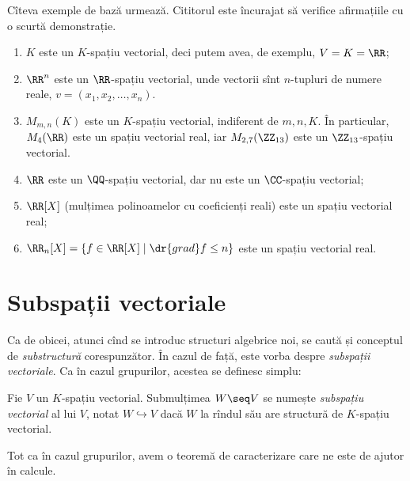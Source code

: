 Cîteva exemple de bază urmează. Cititorul este încurajat să verifice afirmațiile cu o scurtă
demonstrație.
\begin{enumerate}
\item $ K $ este un $ K $-spațiu vectorial, deci putem avea, de exemplu, $ V = K = \RR $;
\item $ \RR^n $ este un $ \RR $-spațiu vectorial, unde vectorii sînt $ n $-tupluri
  de numere reale, $ v = (x_1, x_2, \dots, x_n) $.
\item $ M_{m, n}(K) $ este un $ K $-spațiu vectorial, indiferent de $ m, n, K $. În particular,
  $ M_4(\RR) $ este un spațiu vectorial real, iar $ M_{2, 7}(\ZZ_{13}) $ este un
  $ \ZZ_{13} $-spațiu vectorial.
\item $ \RR $ este un $ \QQ $-spațiu vectorial, dar nu este un $ \CC $-spațiu vectorial;
\item $ \RR[X] $ (mulțimea polinoamelor cu coeficienți reali) este un spațiu vectorial real;
\item $ \RR_n[X] = \{ f \in \RR[X] \mid \dr{grad}f \leq n \} $ este un spațiu vectorial
  real.
\end{enumerate}


\section{Subspații vectoriale}

Ca de obicei, atunci cînd se introduc structuri algebrice noi, se caută
și conceptul de \emph{substructură} corespunzător. În cazul de față, este vorba
despre \emph{subspații vectoriale}. Ca în cazul grupurilor, acestea
se definesc simplu:

\begin{definition}\label{def:subspatii}
  Fie $ V $ un $ K $-spațiu vectorial. Submulțimea $ W \seq V $ se numește
  \emph{subspațiu vectorial} al lui $ V $, notat $ W \hookrightarrow V $ dacă $ W $
  la rîndul său are structură de $ K $-spațiu vectorial.
\end{definition}

Tot ca în cazul grupurilor, avem o teoremă de caracterizare care ne este
de ajutor în calcule.



